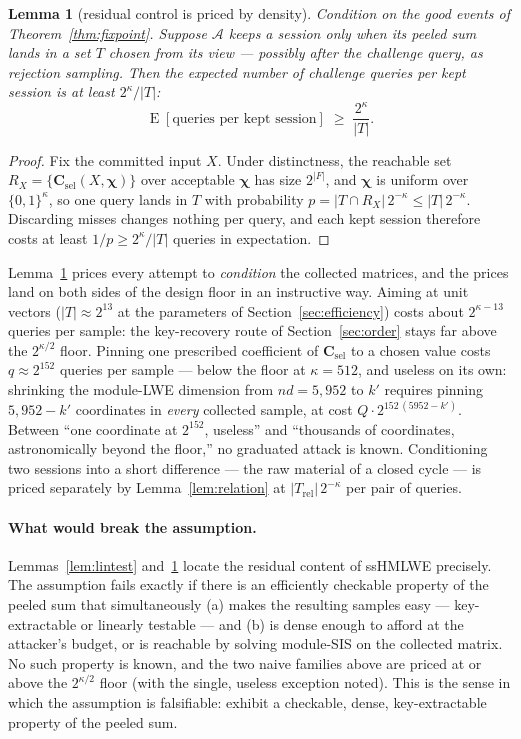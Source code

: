 \documentclass[11pt]{article}
\newtheorem{lemma}[theorem]{Lemma}
\begin{document}
\begin{lemma}[residual control is priced by density]
\label{lem:grind}
Condition on the good events of Theorem~\ref{thm:fixpoint}.  Suppose
$\mathcal A$ keeps a session only when its peeled sum lands in a set $T$
chosen from its view --- possibly after the challenge query, as rejection
sampling.  Then the expected number of challenge queries per kept session is
at least $2^{\kappa}/|T|$:
\[
 \operatorname{E}[\text{queries per kept session}]
 \;\ge\;\frac{2^{\kappa}}{|T|}.
\]
\end{lemma}

\begin{proof}
Fix the committed input $X$.  Under distinctness, the reachable set
$R_X=\{\mathbf C_{\mathrm{sel}}(X,\boldsymbol\chi)\}$ over acceptable
$\boldsymbol\chi$ has size $2^{|F|}$, and $\boldsymbol\chi$ is uniform over
$\{0,1\}^{\kappa}$, so one query lands in $T$ with probability
$p=|T\cap R_X|\,2^{-\kappa}\leq |T|\,2^{-\kappa}$.  Discarding misses changes
nothing per query, and each kept session therefore costs at least
$1/p\ge 2^{\kappa}/|T|$ queries in expectation.
\end{proof}

Lemma~\ref{lem:grind} prices every attempt to \emph{condition} the collected
matrices, and the prices land on both sides of the design floor in an
instructive way.  Aiming at unit vectors ($|T|\approx2^{13}$ at the
parameters of Section~\ref{sec:efficiency}) costs about $2^{\kappa-13}$
queries per sample: the key-recovery route of Section~\ref{sec:order} stays
far above the $2^{\kappa/2}$ floor.  Pinning one prescribed coefficient of
$\mathbf C_{\mathrm{sel}}$ to a chosen value costs $q\approx2^{152}$ queries
per sample --- below the floor at $\kappa=512$, and useless on its own:
shrinking the module-LWE dimension from $nd=5{,}952$ to $k'$ requires
pinning $5{,}952-k'$ coordinates in \emph{every} collected sample, at cost
$Q\cdot 2^{152\,(5952-k')}$.  Between ``one coordinate at $2^{152}$,
useless'' and ``thousands of coordinates, astronomically beyond the floor,''
no graduated attack is known.  Conditioning two sessions into a short
difference --- the raw material of a closed cycle --- is priced separately by
Lemma~\ref{lem:relation} at $|T_{\mathrm{rel}}|\,2^{-\kappa}$ per pair of
queries.

\paragraph{What would break the assumption.}
Lemmas~\ref{lem:lintest} and~\ref{lem:grind} locate the residual content of
ssHMLWE precisely.  The assumption fails exactly if there is an efficiently
checkable property of the peeled sum that simultaneously (a) makes the
resulting samples easy --- key-extractable or linearly testable --- and
(b) is dense enough to afford at the attacker's budget, or is reachable by
solving module-SIS on the collected matrix.  No such property is known, and
the two naive families above are priced at or above the $2^{\kappa/2}$ floor
(with the single, useless exception noted).  This is the sense in which the
assumption is falsifiable: exhibit a checkable, dense, key-extractable
property of the peeled sum.
\end{document}
